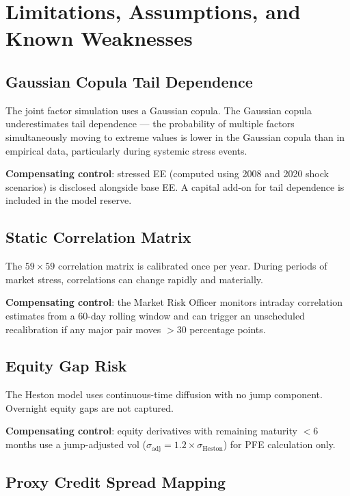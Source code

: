 \documentclass[11pt,a4paper]{article}
\begin{document}
\section{Limitations, Assumptions, and Known Weaknesses}
\label{sec:limits}

\subsection{Gaussian Copula Tail Dependence}

The joint factor simulation uses a Gaussian copula. The Gaussian copula
underestimates tail dependence --- the probability of multiple factors
simultaneously moving to extreme values is lower in the Gaussian copula
than in empirical data, particularly during systemic stress events.

\textbf{Compensating control}: stressed EE (computed using 2008 and 2020 shock
scenarios) is disclosed alongside base EE. A capital add-on for tail dependence
is included in the model reserve.

\subsection{Static Correlation Matrix}

The $59\times 59$ correlation matrix is calibrated once per year. During
periods of market stress, correlations can change rapidly and materially.

\textbf{Compensating control}: the Market Risk Officer monitors intraday
correlation estimates from a 60-day rolling window and can trigger an
unscheduled recalibration if any major pair moves $>30$ percentage points.

\subsection{Equity Gap Risk}

The Heston model uses continuous-time diffusion with no jump component.
Overnight equity gaps are not captured.

\textbf{Compensating control}: equity derivatives with remaining maturity
$<6$ months use a jump-adjusted vol ($\sigma_{\text{adj}} = 1.2 \times
\sigma_{\text{Heston}}$) for PFE calculation only.

\subsection{Proxy Credit Spread Mapping}
\end{document}
